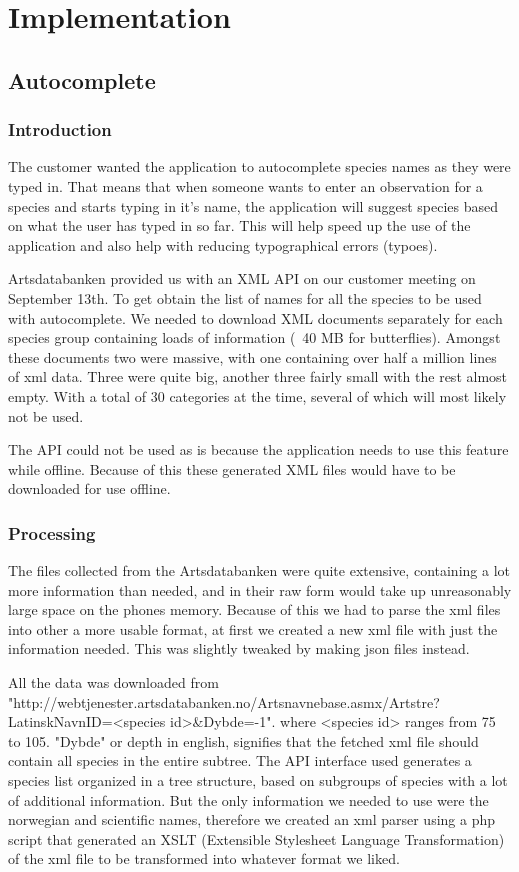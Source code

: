 \section{Implementation}

\subsection{Autocomplete}

	\subsubsection{Introduction}
	The customer wanted the application to autocomplete species names as they were typed in. 
	That means that when someone wants to enter an observation for a species and starts typing in it's name, the application will suggest species based on what the user has typed in so far. 
	This will help speed up the use of the application and also help with reducing typographical errors (typoes).

	Artsdatabanken provided us with an XML API on our customer meeting on September 13th. 
	To get obtain the list of names for all the species to be used with autocomplete. 
	We needed to download XML documents separately for each species group containing loads of information (~40 MB for butterflies).
	Amongst these documents two were massive, with one containing over half a million lines of xml data. 
	Three were quite big, another three fairly small with the rest almost empty. With a total of 30 categories at the time, several of which will most likely not be used.

	The API could not be used as is because the application needs to use this feature while offline. Because of this these generated XML files would have to be downloaded for use offline.

	\subsubsection{Processing}
	The files collected from the Artsdatabanken were quite extensive, containing a lot more information than needed, and in their raw form would take up unreasonably large space on the phones memory. 
	Because of this we had to parse the xml files into other a more usable format, at first we created a new xml file with just the information needed. 
	This was slightly tweaked by making json files instead.

	All the data was downloaded from "http://webtjenester.artsdatabanken.no/Artsnavnebase.asmx/Artstre?LatinskNavnID=<species id>&Dybde=-1".
	where <species id> ranges from 75 to 105. "Dybde" or depth in english, signifies that the fetched xml file should contain all species in the entire subtree.
	The API interface used generates a species list organized in a tree structure, based on subgroups of species with a lot of additional information.
	But the only information we needed to use were the norwegian and scientific names, therefore we created an xml parser using a php script that generated an XSLT (Extensible Stylesheet Language Transformation) of the xml file to be transformed into whatever format we liked.\cite{W3:XSLT} 

